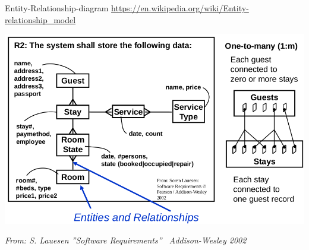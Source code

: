 \begin{Slide}{Entity-Relationship-diagram}
\footnotesize\url{https://en.wikipedia.org/wiki/Entity-relationship_model}

\begin{minipage}[t]{0.9\textwidth}
\vspace{-0.4em}\includegraphics[width=1.0\textwidth]{../img/ER-diagram}
\vspace{-0.1em}
\end{minipage}

{\hfill\fontsize{5}{5}\itshape\selectfont From: S. Lauesen ''Software Requirements'' \textcopyright~Addison-Wesley 2002}
\end{Slide}
